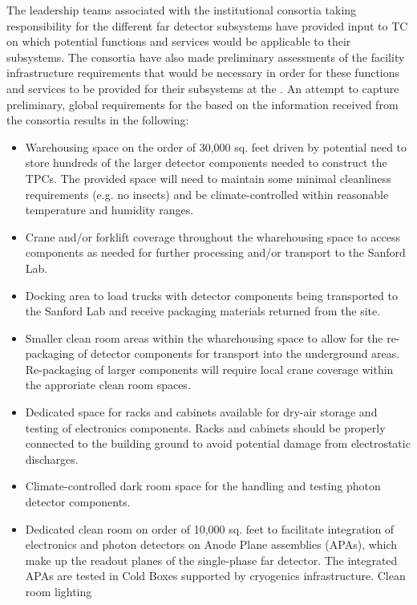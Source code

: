 The leadership teams associated with the  institutional
consortia taking responsibility for the different far detector
subsystems have provided input to TC on which potential 
functions and services would be applicable to their subsystems.  The
consortia have also made preliminary assessments of the facility
infrastructure requirements that would be necessary in order for these
functions and services to be provided for their subsystems at the
.  An attempt to capture preliminary, global requirements
for the  based on the information received from the
consortia results in the following:
\begin{itemize}
  \item Warehousing space on the order of 30,000 sq. feet driven by
    potential need to store hundreds of the larger detector components
    needed to construct the TPCs.  The provided space will need to
    maintain some minimal cleanliness requirements (e.g. no insects)
    and be climate-controlled within reasonable temperature and
    humidity ranges.
  \item Crane and/or forklift coverage throughout the wharehousing
    space to access components as needed for further processing and/or
    transport to the Sanford Lab.
  \item Docking area to load trucks with detector components being
    transported to the Sanford Lab and receive packaging materials
    returned from the site.
  \item Smaller clean room areas within the wharehousing space to
    allow for the re-packaging of detector components for transport
    into the underground areas.  Re-packaging of larger components
    will require local crane coverage within the approriate clean room
    spaces.
  \item Dedicated space for racks and cabinets available for dry-air
    storage and testing of electronics components.  Racks and cabinets
    should be properly connected to the building ground to avoid
    potential damage from electrostatic discharges.
  \item Climate-controlled dark room space for the handling and
    testing photon detector components.
  \item Dedicated clean room on order of 10,000 sq. feet to facilitate
    integration of electronics and photon detectors on Anode Plane
    assemblies (APAs), which make up the readout planes of the
    single-phase far detector. The integrated APAs are tested in Cold
    Boxes supported by cryogenics infrastructure.  Clean room lighting

\end{itemize}

